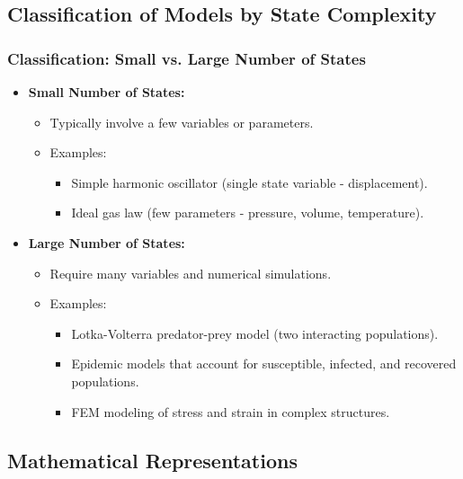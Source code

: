\documentclass{beamer}
\begin{document}
\subsection{Classification of Models by State Complexity}

\begin{frame}
\frametitle{Classification: Small vs. Large Number of States}
\begin{itemize}
    \item \textbf{Small Number of States:}
    \begin{itemize}
        \item Typically involve a few variables or parameters.
        \item Examples:
        \begin{itemize}
            \item Simple harmonic oscillator (single state variable - displacement).
            \item Ideal gas law (few parameters - pressure, volume, temperature).
        \end{itemize}
    \end{itemize}
    
    \item \textbf{Large Number of States:}
    \begin{itemize}
        \item Require many variables and numerical simulations.
        \item Examples:
        \begin{itemize}
            \item Lotka-Volterra predator-prey model (two interacting populations).
            \item Epidemic models that account for susceptible, infected, and recovered populations.
            \item FEM modeling of stress and strain in complex structures.
        \end{itemize}
    \end{itemize}
\end{itemize}
\end{frame}

\subsection{Mathematical Representations}
\end{document}
